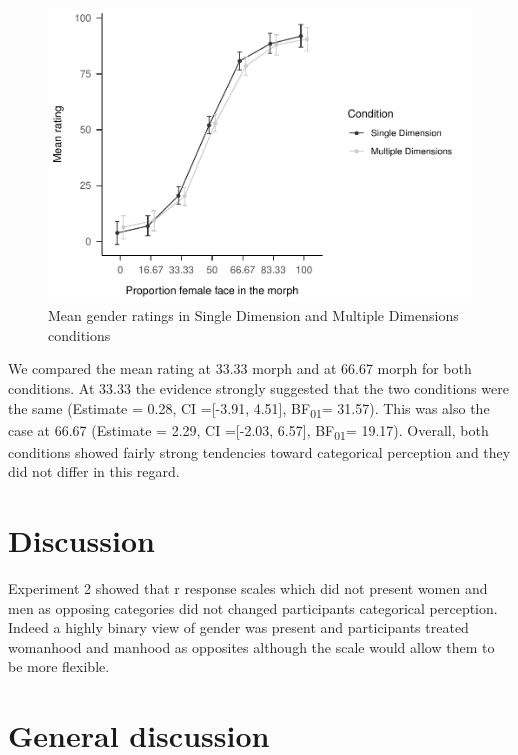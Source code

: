 \documentclass[
  man]{apa7}
\begin{document}
\begin{figure}
\centering
\includegraphics{resp_opts_manus23022_files/figure-latex/exp-two-inf-1.pdf}
\caption{\label{fig:exp-two-inf}Mean gender ratings in Single Dimension and Multiple Dimensions conditions}
\end{figure}

We compared the mean rating at 33.33 morph and at 66.67 morph for both conditions. At 33.33 the evidence strongly suggested that the two conditions were the same
(Estimate = 0.28, CI ={[}-3.91, 4.51{]}, BF\textsubscript{01}= 31.57). This was also the case at 66.67
(Estimate = 2.29, CI ={[}-2.03, 6.57{]}, BF\textsubscript{01}= 19.17). Overall, both conditions showed fairly strong tendencies toward categorical perception and they did not differ in this regard.

\hypertarget{discussion-1}{%
\section{Discussion}\label{discussion-1}}

Experiment 2 showed that r response scales which did not present women and men as opposing categories did not changed participants categorical perception. Indeed a highly binary view of gender was present and participants treated womanhood and manhood as opposites although the scale would allow them to be more flexible.

\hypertarget{general-discussion}{%
\section{General discussion}\label{general-discussion}}
\end{document}
